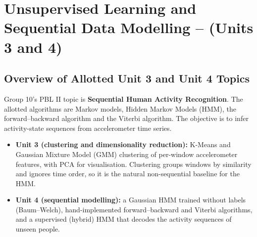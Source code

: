 \chapter{Unsupervised Learning and Sequential Data Modelling – (Units 3 and 4)}

\section{Overview of Allotted Unit 3 and Unit 4 Topics}
Group 10's PBL II topic is \textbf{Sequential Human Activity Recognition}. The allotted algorithms are Markov models,
Hidden Markov Models (HMM), the forward–backward algorithm and the Viterbi algorithm. The objective is to infer
activity-state sequences from accelerometer time series.
\begin{itemize}
\item \textbf{Unit 3 (clustering and dimensionality reduction):} K-Means and Gaussian Mixture Model (GMM) clustering of
per-window accelerometer features, with PCA for visualisation. Clustering groups windows by similarity and ignores time
order, so it is the natural non-sequential baseline for the HMM.
\item \textbf{Unit 4 (sequential modelling):} a Gaussian HMM trained without labels (Baum–Welch), hand-implemented
forward–backward and Viterbi algorithms, and a supervised (hybrid) HMM that decodes the activity sequences of unseen
people.
\end{itemize}

